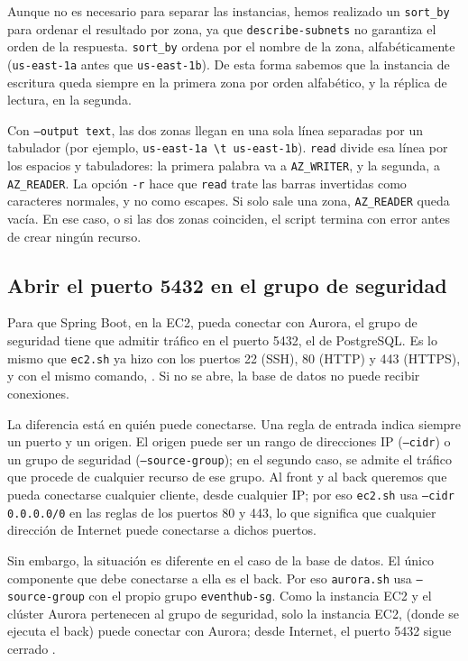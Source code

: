 \documentclass[12pt,a4paper]{article}
\begin{document}
\vspace{1em}

Aunque no es necesario para separar las instancias, hemos realizado un \texttt{sort\_by} para ordenar el resultado por zona, ya que \texttt{describe-subnets} no garantiza el orden de la respuesta. \texttt{sort\_by} ordena por el nombre de la zona, alfabéticamente (\texttt{us-east-1a} antes que \texttt{us-east-1b}). De esta forma sabemos que la instancia de escritura queda siempre en la primera zona por orden alfabético, y la réplica de lectura, en la segunda.

Con \texttt{--output text}, las dos zonas llegan en una sola línea separadas por un tabulador (por ejemplo, \texttt{us-east-1a \textbackslash t us-east-1b}). \texttt{read} divide esa línea por los espacios y tabuladores: la primera palabra va a \texttt{AZ\_WRITER}, y la segunda, a \texttt{AZ\_READER}. La opción \texttt{-r} hace que \texttt{read} trate las barras invertidas como caracteres normales, y no como escapes. Si solo sale una zona, \texttt{AZ\_READER} queda vacía. En ese caso, o si las dos zonas coinciden, el script termina con error antes de crear ningún recurso.

\subsection{Abrir el puerto 5432 en el grupo de seguridad}\label{sec:puerto}

Para que Spring Boot, en la EC2, pueda conectar con Aurora, el grupo de seguridad tiene que admitir tráfico en el puerto 5432, el de PostgreSQL. Es lo mismo que \texttt{ec2.sh} ya hizo con los puertos 22 (SSH), 80 (HTTP) y 443 (HTTPS), y con el mismo comando, \texttt{}. Si no se abre, la base de datos no puede recibir conexiones.

La diferencia está en quién puede conectarse. Una regla de entrada indica siempre un puerto y un origen. El origen puede ser un rango de direcciones IP (\texttt{--cidr}) o un grupo de seguridad (\texttt{--source-group}); en el segundo caso, se admite el tráfico que procede de cualquier recurso de ese grupo. Al front y al back queremos que pueda conectarse cualquier cliente, desde cualquier IP; por eso \texttt{ec2.sh} usa \texttt{--cidr 0.0.0.0/0} en las reglas de los puertos 80 y 443, lo que significa que cualquier dirección de Internet puede conectarse a dichos puertos. 

Sin embargo, la situación es diferente en el caso de la base de datos. El único componente que debe conectarse a ella es el back. Por eso \texttt{aurora.sh} usa \texttt{--source-group} con el propio grupo \texttt{eventhub-sg}. Como la instancia EC2 y el clúster Aurora pertenecen al grupo de seguridad, solo la instancia EC2, (donde se ejecuta el back) puede conectar con Aurora; desde Internet, el puerto 5432 sigue cerrado%
.%
\end{document}
